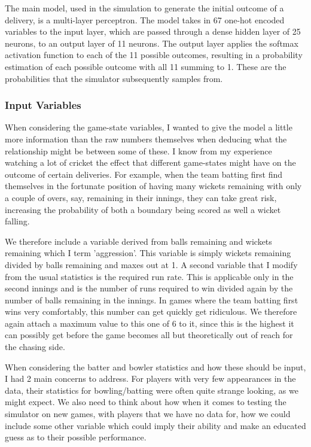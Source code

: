 The main model, used in the simulation to generate the initial outcome of a delivery, is a multi-layer perceptron. The model takes in 67 one-hot encoded variables to the input layer, which are passed through a dense hidden layer of 25 neurons, to an output layer of 11 neurons. The output layer applies the softmax activation function to each of the 11 possible outcomes, resulting in a probability estimation of each possible outcome with all 11 summing to 1. These are the probabilities that the simulator subsequently samples from.

\subsubsection{Input Variables}

When considering the game-state variables, I wanted to give the model a little more information than the raw numbers themselves when deducing what the relationship might be between some of these. I know from my experience watching a lot of cricket the effect that different game-states might have on the outcome of certain deliveries. For example, when the team batting first find themselves in the fortunate position of having many wickets remaining with only a couple of overs, say, remaining in their innings, they can take great risk, increasing the probability of both a boundary being scored as well a wicket falling.

We therefore include a variable derived from balls remaining and wickets remaining which I term 'aggression'. This variable is simply wickets remaining divided by balls remaining and maxes out at 1. A second variable that I modify from the usual statistics is the required run rate. This is applicable only in the second innings and is the number of runs required to win divided again by the number of balls remaining in the innings. In games where the team batting first wins very comfortably, this number can get quickly get ridiculous. We therefore again attach a maximum value to this one of 6 to it, since this is the highest it can possibly get before the game becomes all but theoretically out of reach for the chasing side.

When considering the batter and bowler statistics and how these should be input, I had 2 main concerns to address. For players with very few appearances in the data, their statistics for bowling/batting were often quite strange looking, as we might expect. We also need to think about how when it comes to testing the simulator on new games, with players that we have no data for, how we could include some other variable which could imply their ability and make an educated guess as to their possible performance.

